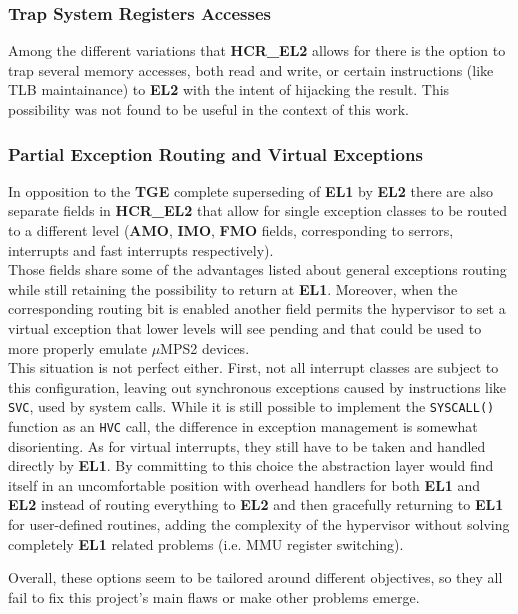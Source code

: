 \documentclass[12pt,a4paper,openright,twoside]{report}
\begin{document}
\subsubsection{Trap System Registers Accesses}
Among the different variations that \textbf{HCR\_EL2} allows for there is the 
option to trap several memory accesses, both read and write, or certain instructions
(like TLB maintainance) to \textbf{EL2} with the intent of hijacking the result.
This possibility was not found to be useful in the context of this work.

\subsubsection{Partial Exception Routing and Virtual Exceptions}
In opposition to the \textbf{TGE} complete superseding of \textbf{EL1} by
\textbf{EL2} there are also separate fields in \textbf{HCR\_EL2} that allow
for single exception classes to be routed to a different level (\textbf{AMO}, 
\textbf{IMO}, \textbf{FMO} fields, corresponding to serrors, interrupts and
fast interrupts respectively).\\
Those fields share some of the advantages listed about general exceptions routing
while still retaining the possibility to return at \textbf{EL1}.
Moreover, when the corresponding routing bit is enabled another field permits the
hypervisor to set a virtual exception that lower levels will see pending and that
could be used to more properly emulate $\mu$MPS2 devices.\\

This situation is not perfect either. First, not all interrupt classes are subject
to this configuration, leaving out synchronous exceptions caused by instructions
like {\tt SVC}, used by system calls. While it is still possible to implement
the {\tt SYSCALL()} function as an {\tt HVC} call, the difference in exception
management is somewhat disorienting.
As for virtual interrupts, they still have to be taken and handled directly by 
\textbf{EL1}. By committing to this choice the abstraction layer would find itself in an 
uncomfortable position with overhead handlers for both \textbf{EL1} and \textbf{EL2}
instead of routing everything to \textbf{EL2} and then gracefully returning to 
\textbf{EL1} for user-defined routines, adding the complexity of the hypervisor
without solving completely \textbf{EL1} related problems (i.e. MMU register 
switching).

Overall, these options seem to be tailored around different objectives, so they
all fail to fix this project's main flaws or make other problems emerge.
\end{document}
